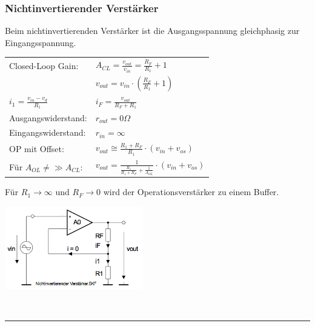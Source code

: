 	\subsubsection{Nichtinvertierender Verstärker}
			Beim nichtinvertierenden Verstärker ist die Ausgangsspannung
      gleichphasig zur Eingangsspannung.\\ 
	 \begin{minipage}[T]{12cm}
      	
        \begin{tabular}{ll}
        	Closed-Loop Gain: &
        	$A_{CL}=\frac{v_{out}}{v_{in}}=\frac{R_F}{R_1}+1$\\
        	& $v_{out} = v_{in}\cdot(\frac{R_F}{R_1}+1)$ \\
        	$i_1=\frac{v_{in}-v_d}{R_1}$ &
        	$i_F=\frac{v_{out}}{R_F+R_1}$\\
          Ausgangswiderstand: &
          $r_{out}=0\Omega$\\
          Eingangswiderstand: &
          $r_{in}=\infty$\\
          OP mit Offset: &
          $v_{out} \cong \frac{R_1+R_F}{R_1} \cdot (v_{in}+v_{os})$\\
          Für $A_{OL} \neq \gg A_{CL}$: & $v_{out} = 
          \frac{1}{\frac{R_1}{R_1+R_F}+\frac{1}{A_{OL}}}\cdot (v_{in}+v_{os})$ \\
        \end{tabular}
        
        Für $R_1 \to \infty$ und $R_F \to 0$ wird der Operationsverstärker zu einem
        Buffer.          	
      \end{minipage}
      \begin{minipage}{6cm}
      	\includegraphics[width=6cm]{./images/ni-verstaerker.png}
      \end{minipage}\\
\hrule

